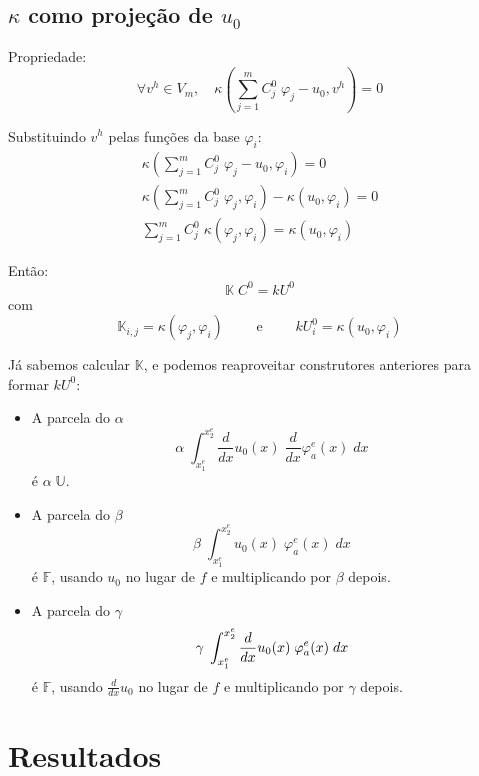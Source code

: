 \documentclass[a4paper]{article}
\newcommand{\vphi}{\varphi}
\begin{document}
\subsection{\texorpdfstring{\(\kappa\)}{Kappa} como projeção de \texorpdfstring{\(u_0\)}{u0}}

Propriedade:
\[
    \forall v^h \in V_m, \quad
    \kappa(\sum_{j=1}^m{ C^0_j \; \vphi_j } - u_0, v^h) = 0
\]

Substituindo \(v^h\) pelas funções da base \(\vphi_i\):
\[ \begin{array}{l} \displaystyle
    \kappa(\sum_{j=1}^m{ C^0_j \; \vphi_j } - u_0, \vphi_i) = 0
    \\ \displaystyle
    \kappa(\sum_{j=1}^m{ C^0_j \; \vphi_j }, \vphi_i) - \kappa(u_0, \vphi_i) = 0
    \\ \displaystyle
    \sum_{j=1}^m{ C^0_j \; \kappa(\vphi_j, \vphi_i) } = \kappa(u_0, \vphi_i)
\end{array} \]

Então:
\[
  \mathbb{K} \; C^0 = kU^0
\]
com
\[
    \mathbb{K}_{i,j} = \kappa(\varphi_j, \varphi_i)
    \qquad\text{ e }\qquad
    kU^0_i = \kappa(u_0, \varphi_i)
\]

Já sabemos calcular \(\mathbb{K}\),
e podemos reaproveitar construtores anteriores
para formar \(kU^0\):
\begin{itemize}
\item A parcela do \(\alpha\)
    \[
        \alpha \; \int_{x^e_1}^{x^e_2}{
            \frac{d}{dx}u_0(x) \; \frac{d}{dx}\varphi^e_a(x)
        \;dx}
    \]
    é \(\alpha \; \mathbb{U}\).

\item A parcela do \(\beta\)
    \[
        \beta \; \int_{x^e_1}^{x^e_2}{
            u_0(x) \; \varphi^e_a(x)
        \;dx}
    \]
    é \(\mathbb{F}\),
    usando \(u_0\) no lugar de \(f\)
    e multiplicando por \(\beta\) depois.

\item A parcela do \(\gamma\)
    \[
        \gamma \; \int_{x^e_1}^{x^e_2}{
            \frac{d}{dx}u_0(x) \; \varphi^e_a(x)
        \;dx}
        \\[2ex] \displaystyle
    \]
    é \(\mathbb{F}\),
    usando \(\frac{d}{dx}u_0\) no lugar de \(f\)
    e multiplicando por \(\gamma\) depois.
\end{itemize}

\newpage
\section{Resultados}
\end{document}
